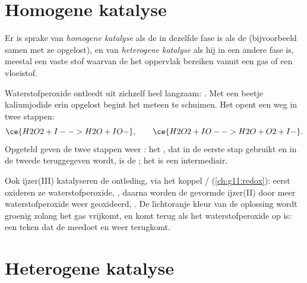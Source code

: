 \section{Homogene katalyse}

\begin{definition}\label{def:g12:catalysis:homogeneous}
Er is sprake van \emph{homogene katalyse}
als de  in dezelfde fase is als de  (bijvoorbeeld
samen met ze opgelost), en van \emph{heterogene katalyse}
als hij in een andere fase is, meestal een vaste stof waarvan de
 het oppervlak bereiken vanuit een gas of een vloeistof.
\end{definition}

\begin{example}\label{ex:g12:catalysis:iodide}
Waterstofperoxide ontleedt uit zichzelf heel langzaam:
. Met een beetje kaliumjodide erin opgelost begint
het meteen te schuimen. Het  opent een weg in twee stappen:
\[
  \ce{H2O2 + I- -> H2O + IO-}, \qquad
  \ce{H2O2 + IO- -> H2O + O2 + I-} .
\]
Opgeteld geven de twee stappen weer : het
, dat in de eerste stap gebruikt en in de tweede teruggegeven
wordt, is de ; het   is een intermediair.
\end{example}


\begin{example}\label{ex:g12:catalysis:iron}
Ook ijzer(III) katalyseren de ontleding, via het koppel
/ (\cref{ch:g11:redox}): eerst oxideren ze
waterstofperoxide, , daarna
worden de gevormde ijzer(II) door meer waterstofperoxide weer
geoxideerd, . De lichtoranje
kleur van de oplossing wordt groenig zolang het gas vrijkomt, en komt
terug als het waterstofperoxide op is: een teken dat de 
meedoet en weer terugkomt.
\end{example}

\section{Heterogene katalyse}

